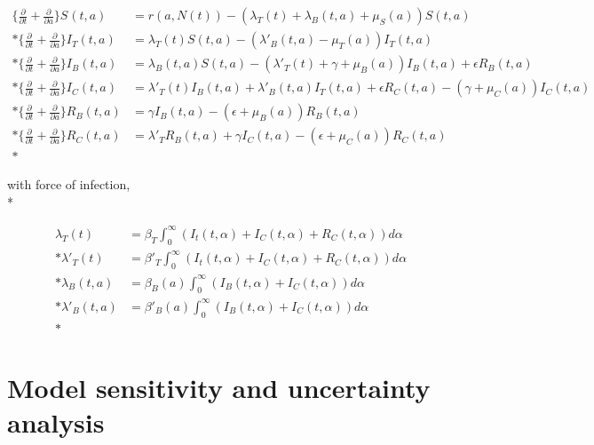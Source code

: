 \documentclass{article}
\begin{document}
\begin{align*}
\Big \{ \frac{\partial}{\partial t} + \frac{\partial}{\partial a} \Big \} S_{}(t, a) &= r(a, N(t)) - (\lambda_{T}(t) + \lambda_{B}(t, a) + \mu_{S}(a)) S(t, a) \\*         
\Big \{ \frac{\partial}{\partial t} + \frac{\partial}{\partial a} \Big \} I_{T}(t, a)&= \lambda_{T}(t) S(t, a) -  (\lambda'_{B}(t, a) - \mu_{T}(a)) I_{T}(t, a) \\*
\Big \{ \frac{\partial}{\partial t} + \frac{\partial}{\partial a} \Big \}  I_{B}(t, a)&=  \lambda_{B}(t, a) S(t, a) - (\lambda'_{T}(t) + \gamma + \mu_{B}(a)) I_{B}(t, a) + \epsilon R_{B}(t, a) \\*
\Big \{ \frac{\partial }{\partial t} + \frac{\partial}{\partial a} \Big \}  I_{C}(t, a)&= \lambda'_{T}(t) I_{B}(t,a) + \lambda'_{B}(t, a) I_{T}(t, a) + \epsilon R_{C}(t, a) - (\gamma + \mu_{C}(a)) I_{C}(t, a) \\*
\Big \{ \frac{\partial}{\partial t} + \frac{\partial}{\partial a} \Big \}  R_{B}(t, a)&=  \gamma I_{B}(t, a) - (\epsilon + \mu_{B}(a)) R_{B}(t, a) \\*            
\Big \{ \frac{\partial}{\partial t} + \frac{\partial}{\partial a} \Big \} R_{C}(t, a)&=  \lambda'_{T} R_{B}(t, a) + \gamma I_{C}(t, a) - (\epsilon + \mu_{C}(a)) R_{C}(t, a) \\* 
\end{align*}

\noindent
with force of infection, \\*

\begin{align*}
\lambda_{T}(t) &= \beta_T \int_{0}^{\infty} (I_t(t,\alpha) + I_{C}(t,\alpha) + R_{C}(t, \alpha)) d\alpha\\*
\lambda'_{T}(t) &= \beta'_T \int_{0}^{\infty} (I_t(t,\alpha) + I_{C}(t,\alpha) + R_{C}(t, \alpha)) d\alpha\\*
\lambda_{B}(t, a) &= \beta_{B}(a) \int_{0}^{\infty} (I_{B}(t,\alpha) + I_{C}(t,\alpha)) d\alpha\\*
\lambda'_{B}(t, a) &= \beta'_{B}(a) \int_{0}^{\infty} (I_{B}(t,\alpha) + I_{C}(t,\alpha)) d\alpha\\*
\end{align*}



\section {Model sensitivity and uncertainty analysis }
\end{document}
